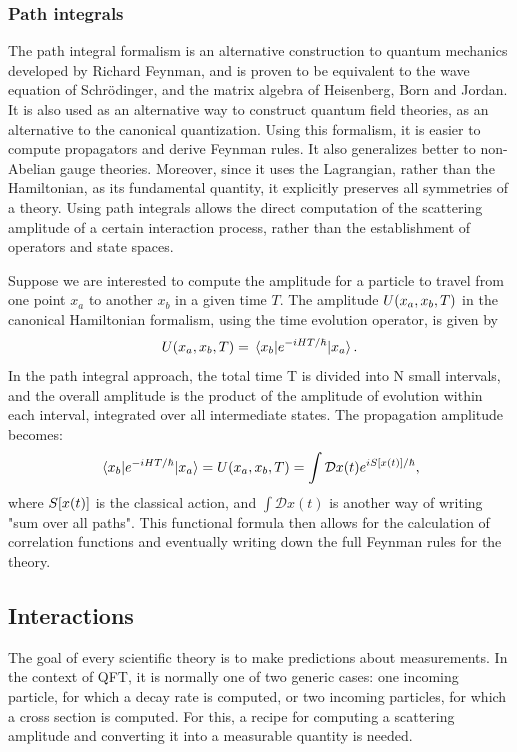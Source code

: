 \subsubsection{Path integrals}
\label{sec:path-integrals}

The path integral formalism is an alternative construction to quantum mechanics developed by Richard Feynman, and is proven to be equivalent to the wave equation of Schrödinger, and the matrix algebra of Heisenberg, Born and Jordan. It is also used as an alternative way to construct quantum field theories, as an alternative to the canonical quantization. Using this formalism, it is easier to compute propagators and derive Feynman rules. It also generalizes better to non-Abelian gauge theories. Moreover, since it uses the Lagrangian, rather than the Hamiltonian, as its fundamental quantity, it explicitly preserves all symmetries of a theory. Using path integrals allows the direct computation of the scattering amplitude of a certain interaction process, rather than the establishment of operators and state spaces. 

Suppose we are interested to compute the amplitude for a particle to travel from one point $x_a$ to another $x_b$ in a given time $T$. The amplitude $U\qty(x_a,x_b,T)$ in the canonical Hamiltonian formalism, using the time evolution operator, is given by
\begin{equation}
U\qty(x_a,x_b,T)=\mel{x_b}{e^{-iHT/\hbar}}{x_a}.
\end{equation}
In the path integral approach, the total time T is divided into N small intervals, and the overall amplitude is the product of the amplitude of evolution within each interval, integrated over all intermediate states. The propagation amplitude becomes:
\begin{equation}
\mel{x_b}{e^{-iHT/\hbar}}{x_a}=U\qty(x_a,x_b,T)=\int \mathcal{D}x(t)e^{iS\qty[x(t)]/\hbar},
\end{equation}
where $S\qty[x(t)]$ is the classical action, and $\int \mathcal{D}x(t)$ is another way of writing "sum over all paths". This functional formula then allows for the calculation of correlation functions and eventually writing down the full Feynman rules for the theory.

\subsection{Interactions}

The goal of every scientific theory is to make predictions about measurements. In the context of QFT, it is normally one of two generic cases: one incoming particle, for which a decay rate is computed, or two incoming particles, for which a cross section is computed. For this, a recipe for computing a scattering amplitude and converting it into a measurable quantity is needed.

